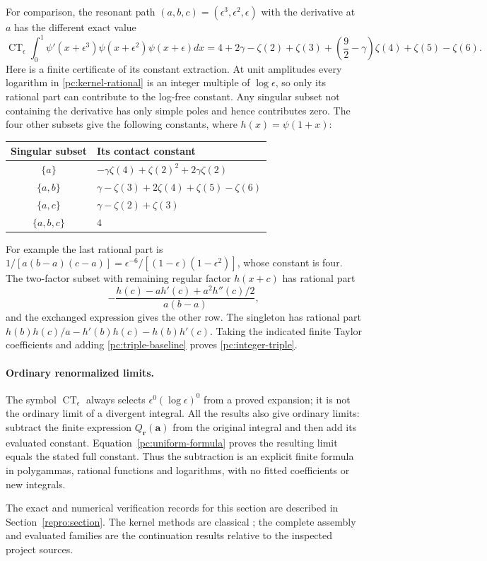 For comparison, the resonant path $(a,b,c)=(\epsilon^3,\epsilon^2,
\epsilon)$ with the derivative at $a$ has the different exact value
\begin{equation}\label{pc:integer-triple}
 \boxed{\displaystyle
 \operatorname{CT}_{\epsilon}
   \int_0^1\psi'(x+\epsilon^3)\psi(x+\epsilon^2)
                            \psi(x+\epsilon)dx
 =4+2\gamma-\zeta(2)+\zeta(3)
       +\left(\frac92-\gamma\right)\zeta(4)
       +\zeta(5)-\zeta(6).}
\end{equation}
Here is a finite certificate of its constant extraction.
At unit amplitudes every logarithm in \eqref{pc:kernel-rational}
is an integer multiple of $\log\epsilon$, so only its rational part
can contribute to the log-free constant.  Any singular subset not
containing the derivative has only simple poles and hence contributes
zero.  The four other subsets give the following constants, where
$h(x)=\psi(1+x)$:
\begin{center}
\begin{tabular}{c|l}
Singular subset & Its contact constant\\\hline
$\{a\}$ & $-\gamma\zeta(4)+\zeta(2)^2+2\gamma\zeta(2)$\\
$\{a,b\}$ & $\gamma-\zeta(3)+2\zeta(4)+\zeta(5)-\zeta(6)$\\
$\{a,c\}$ & $\gamma-\zeta(2)+\zeta(3)$\\
$\{a,b,c\}$ & $4$
\end{tabular}
\end{center}
For example the last rational part is
$1/[a(b-a)(c-a)]=\epsilon^{-6}/[(1-\epsilon)(1-\epsilon^2)]$,
whose constant is four.  The two-factor subset with remaining
regular factor $h(x+c)$ has rational part
\[
 -\frac{h(c)-a h'(c)+a^2h''(c)/2}{a(b-a)},
\]
and the exchanged expression gives the other row.  The singleton
has rational part
$h(b)h(c)/a-h'(b)h(c)-h(b)h'(c)$.
Taking the indicated finite Taylor coefficients and adding
\eqref{pc:triple-baseline} proves \eqref{pc:integer-triple}.

\paragraph{Ordinary renormalized limits.}
The symbol $\operatorname{CT}_{\epsilon}$ always selects
$\epsilon^0(\log\epsilon)^0$ from a proved expansion; it is not the
ordinary limit of a divergent integral.  All the results also give
ordinary limits: subtract the finite expression
$Q_{\boldsymbol r}(\boldsymbol a)$ from the original integral and
then add its evaluated constant.  Equation~\eqref{pc:uniform-formula}
proves the resulting limit equals the stated full constant.  Thus the
subtraction is an explicit finite formula in polygammas, rational
functions and logarithms, with no fitted coefficients or new integrals.


The exact and numerical verification records for this section are
described in Section~\ref{repro:section}. The kernel methods are
classical \cite{DeBoor,Lesch,TicaGalapon,VillanuevaGalapon};
the complete assembly and evaluated families are the continuation
results relative to the inspected project sources.
